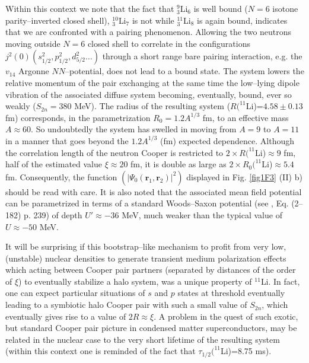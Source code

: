  Within this context we note that the fact that $^9_3$Li$_6$ is well bound ($N=6$ isotone parity--inverted closed shell), $^{10}_3$Li$_7$ is not while $^{11}_3$Li$_8$ is again bound, indicates that we are confronted with a pairing phenomenon. Allowing the two neutrons moving outside $N=6$ closed shell to correlate in the configurations $j^2(0) (s_{1/2}^2, p_{1/2}^2, d_{5/2}^2\dots)$ through a short range bare pairing interaction, e.g. the $v_{14}$ Argonne $NN$--potential, does not lead to a bound state. The system lowers the relative momentum of the pair exchanging at the same time the low--lying dipole vibration of the associated diffuse system becoming, eventually, bound, ever so weakly ($S_{2n}=380$ MeV). The radius of the resulting system ($R(^{11}$Li)=$4.58\pm 0.13$ fm) corresponds, in the parametrization $R_0=1.2 A^{1/3}$ fm, to an effective mass $A\approx 60$. So undoubtedly the system has swelled in moving from $A=9$ to $A=11$ in a manner that goes beyond the $1.2A^{1/3}$ (fm) expected dependence. Although the correlation length of the neutron Cooper is restricted to $2\times R(^{11}$Li)$\approx 9$ fm, half of the estimated value $\xi\approx 20$ fm, it is double as large as $2\times R_0(^{11}$Li)$\approx 5.4$ fm. Consequently, the function $(|\Psi_0(\mathbf r_1,\mathbf r_2)|^2)$ displayed  in Fig. \ref{fig1F3} (II) b) should be read with care.
It is also noted that the associated mean field potential can be parametrized in terms of a standard Woods--Saxon potential (see \cite{Bohr:69}, Eq. (2--182) p. 239) of depth $U'\approx-36$ MeV, much weaker than the typical value of $U\approx-50$ MeV.

It will be surprising if this bootstrap--like mechanism to profit from very low, (unstable) nuclear densities to generate transient medium polarization effects which acting between Cooper pair partners (separated by distances of the order of $\xi$) to eventually stabilize a halo system, was a unique property of $^{11}$Li. In fact, one can expect particular situations of $s$ and $p$ states at threshold eventually leading to a symbiotic halo Cooper pair with such a small value of $S_{2n}$, which  eventually gives rise to a value of $2R\approx\xi$. A problem in the quest of such exotic, but standard Cooper pair picture in condensed matter superconductors, may be related in the nuclear case to the very short lifetime of the resulting system (within this context one is reminded of the fact that $\tau_{1/2}(^{11}$Li)=8.75 ms).


